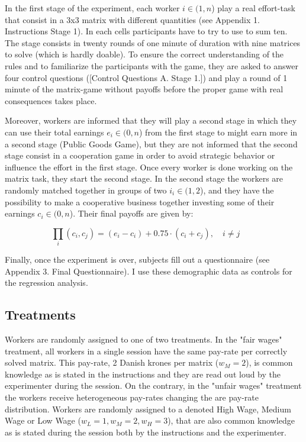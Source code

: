\documentclass[a4paper, 12pt]{article}
\begin{document}
In the first stage of the experiment, each worker $i \in (1,n$) play a real effort-task that consist in a 3x3 matrix with different quantities (see Appendix 1. Instructions Stage 1). In each cells participants have to try to use to sum ten. The stage consists in twenty rounds of one minute of duration with nine matrices to solve (which is hardly doable). To ensure the correct understanding of the rules and to familiarize the participants with the game, they are asked to answer four control questions ([Control Questions A. Stage 1.]) and play a round of 1 minute of the matrix-game without payoffs before the proper game with real consequences takes place. 

Moreover, workers are informed that they will play a second stage in which they can use their total earnings $e_i \in (0,n$) from the first stage to might earn more in a second stage (Public Goods Game), but they are not informed that the second stage consist in a cooperation game in order to avoid strategic behavior or influence the effort in the first stage. Once every worker is done working on the matrix task, they start the second stage. In the second stage the workers are randomly matched together in groups of two $i_i \in (1,2$), and they have the possibility to make a cooperative business together investing some of their earnings $c_i \in (0,n$). Their final payoffs are given by:

\begin{equation}
\prod_i(c_i,c_j) =  (e_i - c_i) + 0.75\cdot (c_i + c_j), \quad i\neq j \quad \quad
\end{equation}

Finally, once the experiment is over, subjects fill out a questionnaire (see Appendix 3. Final Questionnaire). I use these demographic data as controls for the regression analysis. 

\subsection{Treatments}

Workers are randomly assigned to one of two treatments. In the "fair wages" treatment, all workers in a single session have the same pay-rate per correctly solved matrix. This pay-rate, 2 Danish krones per matrix ($w_M =2$), is common knowledge as is stated in the instructions and they are read out loud by the experimenter during the session. 
On the contrary, in the "unfair wages" treatment the workers receive heterogeneous pay-rates changing the are pay-rate distribution. Workers are randomly assigned to a denoted High Wage, Medium Wage or Low Wage ($w_L= 1, w_M = 2, w_H= 3$), that are also common knowledge as is stated during the session both by the instructions and the experimenter. 
\end{document}
